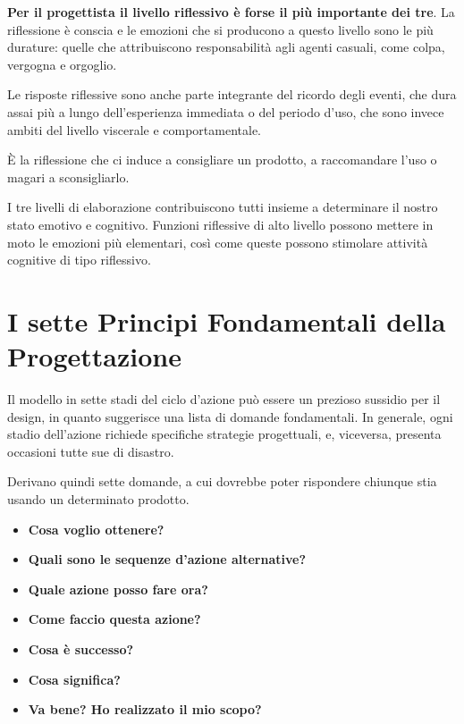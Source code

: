 \documentclass[a4paper,11pt,oneside]{book}
\begin{document}
\textbf{Per il progettista il livello riflessivo è forse il più importante dei tre}. La riflessione è conscia e le emozioni che si producono a questo livello sono le più durature: quelle che attribuiscono responsabilità agli agenti casuali, come colpa, vergogna e orgoglio.

Le risposte riflessive sono anche parte integrante del ricordo degli eventi, che dura assai più a lungo dell'esperienza immediata o del periodo d'uso, che sono invece ambiti del livello viscerale e comportamentale.

È la riflessione che ci induce a consigliare un prodotto, a raccomandare l'uso o magari a sconsigliarlo.

I tre livelli di elaborazione contribuiscono tutti insieme a determinare il nostro stato emotivo e cognitivo. Funzioni riflessive di alto livello possono mettere in moto le emozioni più elementari, così come queste possono stimolare attività cognitive di tipo riflessivo.

\section{I sette Principi Fondamentali della Progettazione}
Il modello in sette stadi del ciclo d'azione può essere un prezioso sussidio per il design, in quanto suggerisce una lista di domande fondamentali. In generale, ogni stadio dell'azione richiede specifiche strategie progettuali, e, viceversa, presenta occasioni tutte sue di disastro.

Derivano quindi sette domande, a cui dovrebbe poter rispondere chiunque stia usando un determinato prodotto.

\begin{itemize}
	\item \textbf{Cosa voglio ottenere?}
	\item \textbf{Quali sono le sequenze d'azione alternative?}
	\item \textbf{Quale azione posso fare ora?}
	\item \textbf{Come faccio questa azione?}
	\item \textbf{Cosa è successo?}
	\item \textbf{Cosa significa?}
	\item \textbf{Va bene? Ho realizzato il mio scopo?}
\end{itemize}
\end{document}
